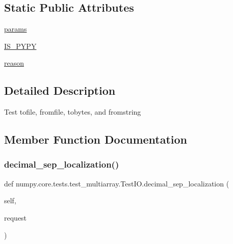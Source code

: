 \subsection*{Static Public Attributes}
\begin{DoxyCompactItemize}
\item 
\hyperlink{classnumpy_1_1core_1_1tests_1_1test__multiarray_1_1TestIO_a3c565fad14dff5c8a754b2eac274e3c4}{params}
\item 
\hyperlink{classnumpy_1_1core_1_1tests_1_1test__multiarray_1_1TestIO_af208e640af7bb5e7ffa68222a805c3e2}{I\+S\+\_\+\+P\+Y\+PY}
\item 
\hyperlink{classnumpy_1_1core_1_1tests_1_1test__multiarray_1_1TestIO_af9580aac19073a863e44ad72e35c9bd5}{reason}
\end{DoxyCompactItemize}


\subsection{Detailed Description}
\begin{DoxyVerb}Test tofile, fromfile, tobytes, and fromstring\end{DoxyVerb}
 

\subsection{Member Function Documentation}
\mbox{\label{classnumpy_1_1core_1_1tests_1_1test__multiarray_1_1TestIO_a8f85f81d71570c3a26275b11e41d248d}} 
\subsubsection{\texorpdfstring{decimal\+\_\+sep\+\_\+localization()}{decimal\_sep\_localization()}}
{\footnotesize\ttfamily def numpy.\+core.\+tests.\+test\+\_\+multiarray.\+Test\+I\+O.\+decimal\+\_\+sep\+\_\+localization (\begin{DoxyParamCaption}\item[{}]{self,  }\item[{}]{request }\end{DoxyParamCaption})}

